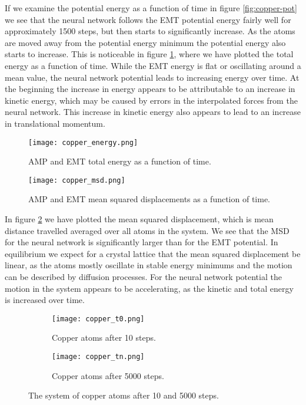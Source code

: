 If we examine the potential energy as a function of time
in figure \ref{fig:copper-pot} we see that the neural network
follows the EMT potential energy fairly well for approximately
1500 steps, but then starts to significantly increase.
As the atoms are moved away from the potential
energy minimum the potential energy also starts to increase.
This is noticeable in figure \ref{fig:copper-energy},
where we have plotted the total energy as a function of time.
While the EMT energy is flat or oscillating around a mean value,
the neural network potential leads to increasing energy over time.
At the beginning the increase in energy appears to be attributable
to an increase in kinetic energy, which may be caused by errors
in the interpolated forces from the neural network.
This increase in kinetic energy also appears to lead to an increase
in translational momentum.

\begin{figure}[H]
    \centering
    \texttt{[image: copper\_energy.png]}
    \caption{AMP and EMT total energy as a function of time.}
    \label{fig:copper-energy}
\end{figure}

\begin{figure}[H]
    \centering
    \texttt{[image: copper\_msd.png]}
    \caption{AMP and EMT mean squared displacements as a function of time.}
    \label{fig:copper-msd}
\end{figure}

In figure \ref{fig:copper-msd} we have plotted the mean squared
displacement, which is mean distance travelled averaged over all
atoms in the system.
We see that the MSD for the neural network is significantly larger
than for the EMT potential. In equilibrium we expect for a crystal lattice
that the mean squared displacement be linear, as the atoms
mostly oscillate in stable energy minimums and the motion can be
described by diffusion processes.
For the neural network potential the motion in the system appears
to be accelerating, as the kinetic and total energy is increased
over time.

\begin{figure}[H]
\begin{adjustbox}{max width=1.2\linewidth,center}
\centering
  \begin{subfigure}[b]{0.55\textwidth}
      \texttt{[image: copper\_t0.png]}
      \caption{Copper atoms after 10 steps.}
    \label{fig:f1}
  \end{subfigure}
  \hfill
  \begin{subfigure}[b]{0.55\textwidth}
      \texttt{[image: copper\_tn.png]}
      \caption{Copper atoms after 5000 steps.}
    \label{fig:f2}
  \end{subfigure}
\end{adjustbox}
    \caption{The system of copper atoms after 10 and 5000 steps.}
    \label{fig:copper_sw}
\end{figure}

